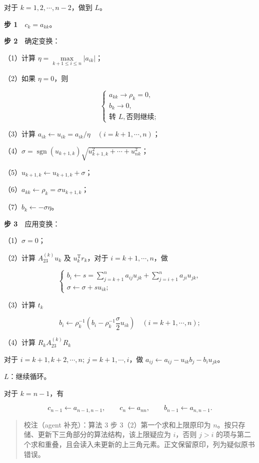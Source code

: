 \documentclass[
  10pt,
  fontset=fandol]{ctexart}
\begin{document}
对于 \(k=1,2,\cdots,n-2\)，做到 \(L\)。

\textbf{步 1}　\(c_k=a_{kk}\)。

\textbf{步 2}　确定变换：

（1）计算 \(\eta=\max\limits_{k+1\leq i\leq n}|a_{ik}|\)；

（2）如果 \(\eta=0\)，则

\[
\begin{cases}
a_{kk}\to\rho_k=0,\\
b_k\to0,\\
\text{转 }L,\text{否则继续};
\end{cases}
\]

（3）计算 \(a_{ik}\leftarrow u_{ik}=a_{ik}/\eta\quad(i=k+1,\cdots,n)\)；

（4）\(\sigma=\operatorname{sgn}(u_{k+1,k})\sqrt{u_{k+1,k}^2+\cdots+u_{nk}^2}\)；

（5）\(u_{k+1,k}\leftarrow u_{k+1,k}+\sigma\)；

（6）\(a_{kk}\leftarrow\rho_k=\sigma u_{k+1,k}\)；

（7）\(b_k\leftarrow-\sigma\eta\)。

\textbf{步 3}　应用变换：

（1）\(\sigma=0\)；

（2）计算 \(A_{23}^{(k)}u_k\) 及 \(u_k^{\mathrm T}r_k\)，对于 \(i=k+1,\cdots,n\)，做

\[
\begin{cases}
b_i\leftarrow s=\displaystyle\sum_{j=k+1}^{n}a_{ij}u_{jk}+\displaystyle\sum_{j=i+1}^{n}a_{ji}u_{jk},\\
\sigma\leftarrow\sigma+su_{ik};
\end{cases}
\]

（3）计算 \(t_k\)

\[
b_i\leftarrow\rho_k^{-1}\left(b_i-\rho_k^{-1}\frac\sigma2u_{ik}\right)
\quad(i=k+1,\cdots,n);
\]

（4）计算 \(R_kA_{23}^{(k)}R_k\)

对于 \(i=k+1,\allowbreak k+2,\allowbreak \cdots,\allowbreak n;\ j=k+1,\allowbreak \cdots,\allowbreak i\)，做 \(a_{ij}\leftarrow a_{ij}-u_{ik}b_j-b_iu_{jk}\)。

\(L\)：继续循环。

对于 \(k=n-1\)，有

\[
c_{n-1}\leftarrow a_{n-1,n-1},\qquad c_n\leftarrow a_{nn},\qquad b_{n-1}\leftarrow a_{n,n-1}.
\]

\begin{quote}
校注（agent 补充）：算法 3 步 3（2）第一个求和上限原印为 \(n\)。按只存储、更新下三角部分的算法结构，该上限疑应为 \(i\)，否则 \(j>i\) 的项与第二个求和重叠，且会读入未更新的上三角元素。正文保留原印，列为疑似原书错误。
\end{quote}
\end{document}
